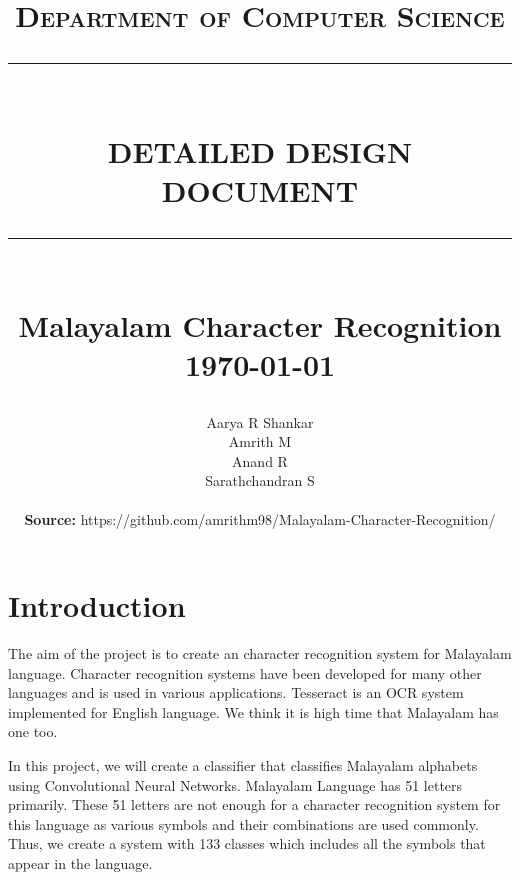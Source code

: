 \documentclass[12pt]{report}
\newcommand{\HRule}[1]{\rule{\linewidth}{#1}}
\begin{document}
\title{ \normalsize \textsc{Department of Computer Science}
		\\ [2.0cm]
		\HRule{0.5pt} \\
		\LARGE \textbf{\uppercase{Detailed Design Document}}
		\HRule{2pt} \\ [0.5cm]
		\textbf{Malayalam Character Recognition }\\
		\normalsize \today \vspace*{5\baselineskip}}

\date{}

\author{
		Aarya R Shankar \\ 
		Amrith M \\
		Anand R \\
		Sarathchandran S \\ \\
		\textbf{Source: }https://github.com/amrithm98/Malayalam-Character-Recognition/
}
\maketitle
\newpage

\sectionfont{\scshape}


\section*{Introduction}
The aim of the project is to create an character recognition system for Malayalam language. Character recognition systems have been developed for many other languages and is used in various applications. Tesseract is an OCR system implemented for English language. We think it is high time that Malayalam has one too.

In this project, we will create a classifier that classifies Malayalam alphabets using Convolutional Neural Networks. Malayalam Language has 51 letters primarily. These 51 letters are not enough for a character recognition system for this language as various symbols and their combinations are used commonly. Thus, we create a system with 133 classes which includes all the symbols that appear in the language. 
\end{document}
